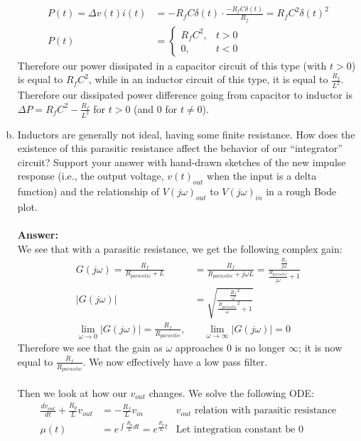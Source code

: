 \documentclass[12pt, a4paper]{article}
\begin{document}
\begin{enumerate}[(a)]
\begin{align*}
P(t) = \Delta v(t) i(t) &= -R_f C \delta(t) \cdot \frac{ -R_f C \delta(t)}{R_f} = R_f C^2 \delta(t)^2 \\
    P(t) &= \begin{cases}
      R_f C^2, & t > 0 \\
      0, & t < 0
    \end{cases}
\end{align*}
Therefore our power dissipated in a capacitor circuit of this type (with $t>0$) is equal to $R_f C^2$, while in an inductor circuit of this type, it is equal to $\frac{R_f}{L^2}$. Therefore our dissipated power difference going from capacitor to inductor is $\Delta P = R_f C^2 - \frac{R_f}{L^2}$ for $t > 0$ (and 0 for $t \neq 0$).
\item Inductors are generally not ideal, having some finite resistance. How does the
existence of this parasitic resistance affect the behavior of our “integrator” circuit?
Support your answer with hand-drawn sketches of the new impulse response (i.e., the
output voltage, $v(t)_{out}$ when the input is a delta function) and the relationship of $V(j\omega)_{out}$ to $V(j\omega)_{in}$ in a rough Bode plot. \\ \\
\textbf{Answer: } \\
We see that with a parasitic resistance, we get the following complex gain:
\begin{align*}
G(j\omega) = \frac{R_f}{R_{parasitic} + L} &= \frac{R_f}{R_{parasitic} + j\omega L} = \frac{\frac{R_f}{j\omega}}{\frac{R_{parasitic}}{j\omega} + 1} \\ 
|G(j\omega)| &= \sqrt{\frac{\frac{R_f}{\omega}^2}{\frac{R_{parasitic}}{\omega}^2 + 1}} \\
\lim_{\omega \to 0} |G(j\omega)|  = \frac{R_f}{R_{parasitic}}, &\quad \lim_{\omega \to \infty} |G(j\omega)|  = 0
\end{align*}
Therefore we see that the gain as $\omega$ approaches 0 is no longer $\infty$; it is now equal to $\frac{R_f}{R_{parasitic}}$. We now effectively have a low pass filter. \\ \\
Then we look at how our $v_{out}$ changes. We solve the following ODE:
\begin{align*}
\frac{d v_{out}}{d t}+\frac{R_{p}}{L} v_{out} &=-\frac{R_{f}}{L} v_{i n} &\text{$v_{out}$ relation with parasitic resistance}\\
\mu(t) &= e^{\int{\frac{R_p}{L}} dt} = e^{\frac{R_p}{L}t} &\text{Let integration constant be 0}\\

\end{align*}
\end{enumerate}
\end{document}
